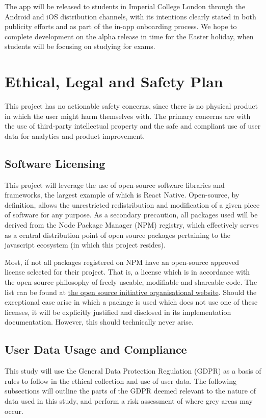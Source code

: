The app will be released to students in Imperial College London through the Android and iOS distribution channels, with its intentions clearly stated in both publicity efforts and as part of the in-app onboarding process. We hope to complete development on the alpha release in time for the Easter holiday, when students will be focusing on studying for exams.

\section{Ethical, Legal and Safety Plan}
This project has no actionable safety concerns, since there is no physical product in which the user might harm themselves with. The primary concerns are with the use of third-party intellectual property and the safe and compliant use of user data for analytics and product improvement.

\subsection{Software Licensing}
This project will leverage the use of open-source software libraries and frameworks, the largest example of which is React Native. Open-source, by definition, allows the unrestricted redistribution and modification of a given piece of software for any purpose. As a secondary precaution, all packages used will be derived from the Node Package Manager (NPM) registry, which effectively serves as a central distribution point of open source packages pertaining to the javascript ecosystem (in which this project resides).

Most, if not all packages registered on NPM have an open-source approved license selected for their project. That is, a license which is in accordance with the open-source philosophy of freely useable, modifiable and shareable code. The list can be found at \href{https://opensource.org/licenses}{the open source initiative organisational website}. Should the exceptional case arise in which a package is used which does not use one of these licenses, it will be explicitly justified and disclosed in its implementation documentation. However, this should technically never arise.

\subsection{User Data Usage and Compliance}
This study will use the General Data Protection Regulation (GDPR) as a basis of rules to follow in the ethical collection and use of user data. The following subsections will outline the parts of the GDPR deemed relevant to the nature of data used in this study, and perform a risk assessment of where grey areas may occur.


